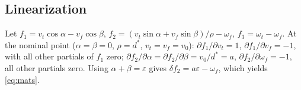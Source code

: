 \subsection{Linearization}
Let $f_1=v_t\cos\alpha-v_f\cos\beta$, $f_2=(v_t\sin\alpha+v_f\sin\beta)/\rho-\omega_f$, $f_3=\omega_t-\omega_f$. At the nominal point ($\alpha=\beta=0$, $\rho=d^\ast$, $v_t=v_f=v_0$): $\partial f_1/\partial v_t=1$, $\partial f_1/\partial v_f=-1$, with all other partials of $f_1$ zero; $\partial f_2/\partial\alpha=\partial f_2/\partial\beta=v_0/d^\ast=a$, $\partial f_2/\partial\omega_f=-1$, all other partials zero. Using $\alpha+\beta=\varepsilon$ gives $\delta f_2=a\varepsilon-\omega_f$, which yields \eqref{eq:mats}.

